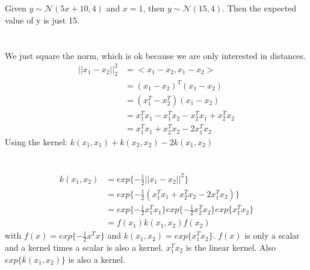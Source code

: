 \documentclass[11pt]{article}
\newcommand{\exercise}{\section{}}
\begin{document}
\exercise
Given $y \sim \mathcal{N}(5x + 10,4)$ and $x=1$, then $y \sim \mathcal{N}(15,4)$.
Then the expected value of y is just 15.

\exercise
We just square the norm, which is ok because we are only interested in distances.
\begin{align}
	||x_1 - x_2||_2^2 &= <x_1 - x_2, x_1 - x_2> \\
	&= (x_1 - x_2)^T(x_1 - x_2) \\
	&= (x_1^T - x_2^T)(x_1 - x_2) \\
	&= x_1^Tx_1 - x_1^Tx_2 - x_2^Tx_1 + x_2^Tx_2 \\
	&= x_1^Tx_1 + x_2^Tx_2 - 2x_1^Tx_2
\end{align}
Using the kernel: $k(x_1,x_1) + k(x_2,x_2) - 2k(x_1,x_2)$

\exercise
\begin{align}
	k(x_1, x_2) &= exp\{-\frac{1}{2} ||x_1 - x_2||^2\} \\
	&= exp\{-\frac{1}{2} (x_1^Tx_1 + x_2^Tx_2 - 2x_1^Tx_2)\} \\
	&= exp\{-\frac{1}{2} x_1^Tx_1\}exp\{-\frac{1}{2} x_2^Tx_2\}exp\{x_1^Tx_2\}\\
	&= f(x_1)k(x_1, x_2)f(x_2)
\end{align}
with $f(x) = exp\{-\frac{1}{2}x^Tx\}$ and $k(x_1,x_2) = exp\{x_1^Tx_2 \}$.
$f(x)$ is only a scalar and a kernel times a scalar is also a kernel. $x_1^Tx_2$ is the linear kernel. Also $exp\{ k(x_1, x_2)\}$ is also a kernel.
\end{document}
